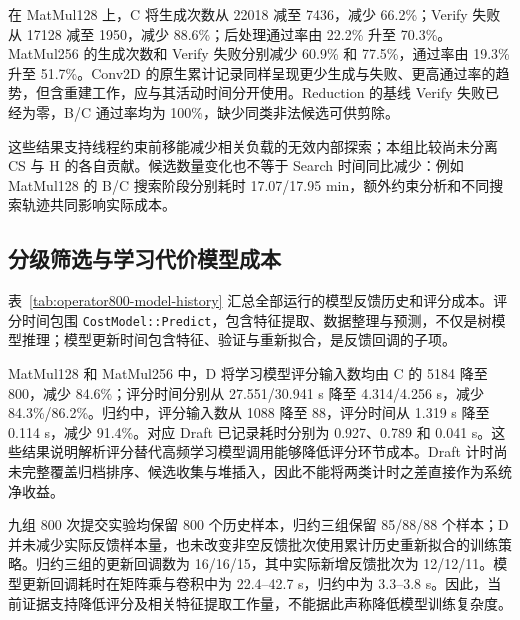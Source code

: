 在 MatMul128 上，C 将生成次数从 22018 减至 7436，减少 66.2\%；Verify 失败从 17128 减至 1950，减少 88.6\%；后处理通过率由 22.2\% 升至 70.3\%。MatMul256 的生成次数和 Verify 失败分别减少 60.9\% 和 77.5\%，通过率由 19.3\% 升至 51.7\%。Conv2D 的原生累计记录同样呈现更少生成与失败、更高通过率的趋势，但含重建工作，应与其活动时间分开使用。Reduction 的基线 Verify 失败已经为零，B/C 通过率均为 100\%，缺少同类非法候选可供剪除。

这些结果支持线程约束前移能减少相关负载的无效内部探索；本组比较尚未分离 CS 与 H 的各自贡献。候选数量变化也不等于 Search 时间同比减少：例如 MatMul128 的 B/C 搜索阶段分别耗时 17.07/17.95 min，额外约束分析和不同搜索轨迹共同影响实际成本。

\subsection{分级筛选与学习代价模型成本}
\label{sec:ga-density}
表~\ref{tab:operator800-model-history} 汇总全部运行的模型反馈历史和评分成本。评分时间包围 \texttt{CostModel::Predict}，包含特征提取、数据整理与预测，不仅是树模型推理；模型更新时间包含特征、验证与重新拟合，是反馈回调的子项。

\begin{table}[t]
\centering
\caption{学习代价模型与 Draft 的累计成本，时间单位为 s。评分输入按调用累计，可重复包含同一候选；历史样本为实际测量反馈数，更新回调次数含无新增反馈的空批次。$\dagger$：Conv2D/C 的模型评分输入数和评分时间包含状态重建，表中保留原值，不据此计算活动调优期间的 C/D 净节省。}
\label{tab:operator800-model-history}
\label{tab:draft-scoring}
\small
\setlength{\tabcolsep}{4pt}

\end{table}

MatMul128 和 MatMul256 中，D 将学习模型评分输入数均由 C 的 5184 降至 800，减少 84.6\%；评分时间分别从 27.551/30.941 s 降至 4.314/4.256 s，减少 84.3\%/86.2\%。归约中，评分输入数从 1088 降至 88，评分时间从 1.319 s 降至 0.114 s，减少 91.4\%。对应 Draft 已记录耗时分别为 0.927、0.789 和 0.041 s。这些结果说明解析评分替代高频学习模型调用能够降低评分环节成本。Draft 计时尚未完整覆盖归档排序、候选收集与堆插入，因此不能将两类计时之差直接作为系统净收益。

九组 800 次提交实验均保留 800 个历史样本，归约三组保留 85/88/88 个样本；D 并未减少实际反馈样本量，也未改变非空反馈批次使用累计历史重新拟合的训练策略。归约三组的更新回调数为 16/16/15，其中实际新增反馈批次为 12/12/11。模型更新回调耗时在矩阵乘与卷积中为 22.4--42.7 s，归约中为 3.3--3.8 s。因此，当前证据支持降低评分及相关特征提取工作量，不能据此声称降低模型训练复杂度。

